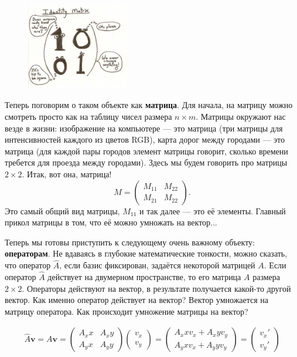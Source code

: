 \documentclass[12pt]{article}
\begin{document}
\begin{figure}
  \begin{center}
    \includegraphics[width=0.40\textwidth]{algebrajoke2.jpg}
  \end{center}
\end{figure}

Теперь поговорим о таком объекте как {\bf матрица}. Для начала, на матрицу можно смотреть просто как на таблицу чисел размера $n \times m$. Матрицы окружают нас везде в жизни: изображение на компьютере --- это матрица (три матрицы для интенсивностей каждого из цветов RGB), карта дорог между городами --- это матрица (для каждой пары городов элемент матрицы говорит, сколько времени требется для проезда между городами). Здесь мы будем говорить про матрицы $2 \times 2$. Итак, вот она, матрица! $$M = \begin{pmatrix} M_11 & M_22 \\ M_21 & M_22\end{pmatrix}.$$
Это самый общий вид матрицы, $M_11$ и так далее --- это её элементы. Главный прикол матрицы в том, что её можно умножать на вектор...

Теперь мы готовы приступить к следующему очень важному объекту: {\bf операторам}. Не вдаваясь в глубокие математические тонкости, можно сказать, что оператор $\hat{A}$, если базис фиксирован, задаётся некоторой матрицей $A$. Если оператор $\hat{A}$ действует на двумерном пространстве, то его матрица $A$ размера $2 \times 2$. Операторы действуют на вектор, в результате получается какой-то другой вектор. Как именно оператор действует на вектор? Вектор умножается на матрицу оператора. Как происходит умножение матрицы на вектор?

\begin{gather*}
\hat{A} \mathbf{v} = A \mathbf{v} = \begin{pmatrix}A_xx & A_xy \\ A_yx & A_yy \end{pmatrix} \begin{pmatrix} v_x \\ v_y\end{pmatrix} = \begin{pmatrix} A_xx v_x + A_xy v_y \\ A_yx v_x + A_yy v_y\end{pmatrix} = \begin{pmatrix} v_x' \\ v_y'\end{pmatrix} 
\end{gather*}
\end{document}
